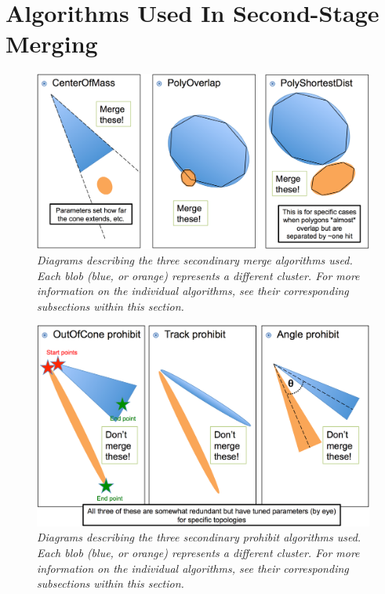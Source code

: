 \documentclass{article}
\begin{document}
\section{Algorithms Used In Second-Stage Merging} \label{sec:SecondMerging}
\begin{figure}[h!]
\begin{center}
\includegraphics[width=150mm]{Figures/second_merge_algos.png}
\end{center}
\caption{\textit{Diagrams describing the three secondinary merge algorithms used. Each blob (blue, or orange) represents a different cluster. For more information on the individual algorithms, see their corresponding subsections within this section.}}
\label{second_merge_algos_fig}
\end{figure}

\begin{figure}[h!]
\begin{center}
\includegraphics[width=150mm]{Figures/second_prohibit_algos.png}
\end{center}
\caption{\textit{Diagrams describing the three secondinary prohibit algorithms used. Each blob (blue, or orange) represents a different cluster. For more information on the individual algorithms, see their corresponding subsections within this section.}}
\label{second_prohibit_algos_fig}
\end{figure}
\end{document}
